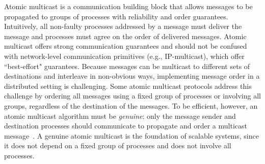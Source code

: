 Atomic multicast is a communication building block that allows messages to be propagated to groups of processes with reliability and order guarantees.
Intuitively, all non-faulty processes addressed by a message must deliver the message and processes must agree on the order of delivered messages.
Atomic multicast offers strong communication guarantees and should not be confused with network-level communication primitives (e.g., IP-multicast), which offer ``best-effort" guarantees.
Because messages can be multicast to different sets of destinations and interleave in non-obvious ways, implementing message order in a distributed setting is challenging.
Some atomic multicast protocols address this challenge by ordering all messages using a fixed group of processes or involving all groups, regardless of the destination of the messages.
To be efficient, however, an atomic multicast algorithm must be \emph{genuine}: only the message sender and destination processes should communicate to propagate and order a multicast message~\cite{GS01b}.
%
A genuine atomic multicast is the foundation of scalable systems, since it does not depend on a fixed group of processes and does not involve all processes.
